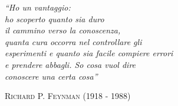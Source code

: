\newpage
\thispagestyle{empty}
\begin{center}
{ }
\end{center}

\newpage
\thispagestyle{empty}
\normalfont
\vspace*{8cm}

\begin{flushright}
\textit{                          ``Ho un vantaggio:\\
                         ho scoperto quanto sia duro\\
                     il cammino verso la conoscenza,\\
             quanta cura occorra nel controllare gli\\
     esperimenti e quanto sia facile compiere errori\\
               e prendere abbagli. So cosa vuol dire\\
                            conoscere una certa cosa''}
\end{flushright}
\begin{flushright} \textsc{Richard P. Feynman} (1918 - 1988) \end{flushright}
